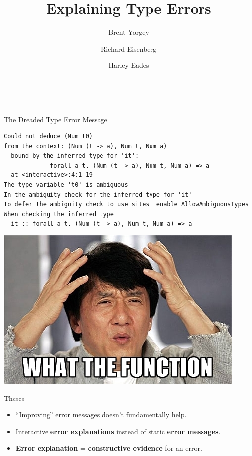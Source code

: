 \documentclass[xcolor=svgnames,12pt,aspectratio=169]{beamer}
\title{Explaining Type Errors}
\date{\theschool \\ \thedate}
\author{{\usebeamercolor[fg]{title} Brent Yorgey} \and Richard
  Eisenberg \and Harley Eades}
\newenvironment{xframe}[1][]
  {\begin{frame}[fragile,environment=xframe,#1]}
  {\end{frame}}
\renewcommand{\emph}{\textbf}
\begin{document}
\begin{xframe}{}
   \titlepage
\end{xframe}

\begin{xframe}{The Dreaded Type Error Message}
\footnotesize
\begin{Verbatim}
Could not deduce (Num t0)
from the context: (Num (t -> a), Num t, Num a)
  bound by the inferred type for 'it':
             forall a t. (Num (t -> a), Num t, Num a) => a
  at <interactive>:4:1-19
The type variable 't0' is ambiguous
In the ambiguity check for the inferred type for 'it'
To defer the ambiguity check to use sites, enable AllowAmbiguousTypes
When checking the inferred type
  it :: forall a t. (Num (t -> a), Num t, Num a) => a
\end{Verbatim}
\end{xframe}

\begin{xframe}{}
  \begin{center}
    \includegraphics{what-the-function.jpg}
  \end{center}
\end{xframe}

\begin{xframe}{Theses}
  \begin{itemize}
  \item ``Improving'' error messages doesn't fundamentally help.
  \item Interactive \emph{error explanations} instead of static
    \emph{error messages}.
  \item \emph{Error explanation} = \emph{constructive evidence} for
    an error.
  \end{itemize}
\end{xframe}
\end{document}
